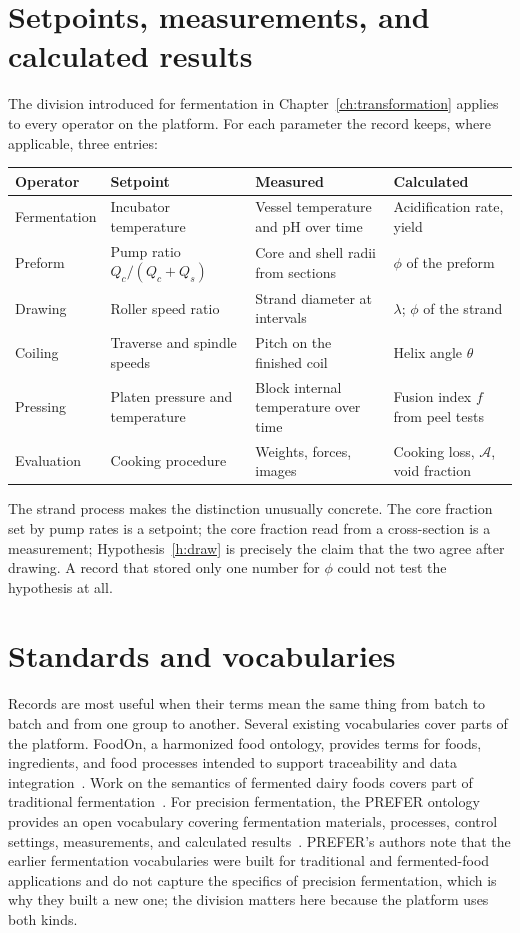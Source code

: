 \documentclass[11pt,openany]{book}
\theoremstyle{definition}
\begin{document}
\section{Setpoints, measurements, and calculated results}

The division introduced for fermentation in Chapter~\ref{ch:transformation} applies to every operator on the platform. For each parameter the record keeps, where applicable, three entries:

\begin{center}
\small
\begin{tabularx}{\linewidth}{@{}lXXX@{}}
\toprule
Operator & Setpoint & Measured & Calculated \\
\midrule
Fermentation & Incubator temperature & Vessel temperature and pH over time & Acidification rate, yield \\
Preform & Pump ratio $Q_c/(Q_c+Q_s)$ & Core and shell radii from sections & $\phi$ of the preform \\
Drawing & Roller speed ratio & Strand diameter at intervals & $\lambda$; $\phi$ of the strand \\
Coiling & Traverse and spindle speeds & Pitch on the finished coil & Helix angle $\theta$ \\
Pressing & Platen pressure and temperature & Block internal temperature over time & Fusion index $f$ from peel tests \\
Evaluation & Cooking procedure & Weights, forces, images & Cooking loss, $\mathcal{A}$, void fraction \\
\bottomrule
\end{tabularx}
\end{center}

The strand process makes the distinction unusually concrete. The core fraction set by pump rates is a setpoint; the core fraction read from a cross-section is a measurement; Hypothesis~\ref{h:draw} is precisely the claim that the two agree after drawing. A record that stored only one number for $\phi$ could not test the hypothesis at all.

\section{Standards and vocabularies}

Records are most useful when their terms mean the same thing from batch to batch and from one group to another. Several existing vocabularies cover parts of the platform. FoodOn, a harmonized food ontology, provides terms for foods, ingredients, and food processes intended to support traceability and data integration~\cite{foodon2018}. Work on the semantics of fermented dairy foods covers part of traditional fermentation~\cite{vitali2022}. For precision fermentation, the PREFER ontology provides an open vocabulary covering fermentation materials, processes, control settings, measurements, and calculated results~\cite{prefer2026}. PREFER's authors note that the earlier fermentation vocabularies were built for traditional and fermented-food applications and do not capture the specifics of precision fermentation, which is why they built a new one; the division matters here because the platform uses both kinds.
\end{document}
